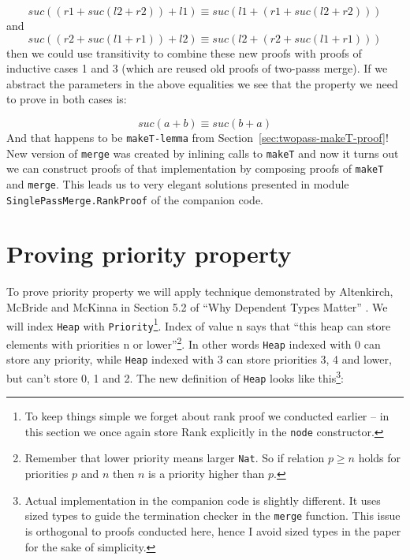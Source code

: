 \begin{equation*}
suc ((r1 + suc (l2 + r2)) + l1) ≡ suc (l1 + (r1 + suc (l2 + r2)))
\end{equation*}
\noindent
and
\begin{equation*}
suc ((r2 + suc (l1 + r1)) + l2) ≡ suc (l2 + (r2  + suc (l1 + r1)))
\end{equation*}
\noindent
then we could use transitivity to combine these new proofs with proofs of inductive cases 1 and 3 (which are reused old proofs of two-passs merge). If we abstract the parameters in the above equalities we see that the property we need to prove in both cases is:

\begin{equation*}
suc (a + b) ≡ suc (b + a)
\end{equation*}
\noindent
And that happens to be \texttt{makeT-lemma} from Section~\ref{sec:twopass-makeT-proof}! New version of \texttt{merge} was created by inlining calls to \texttt{makeT} and now it turns out we can construct proofs of that implementation by composing proofs of \texttt{makeT} and \texttt{merge}. This leads us to very elegant solutions presented in module \texttt{SinglePassMerge.}\texttt{RankProof} of the companion code.

\section[Proving priority property]{Proving priority property} \label{sec:priority-invariant}

To prove priority property we will apply technique demonstrated by Altenkirch, McBride and McKinna in Section 5.2 of ``Why Dependent Types Matter'' \cite{AltMcBMcK05}. We will index \texttt{Heap} with \texttt{Priority}\footnote{To keep things simple we forget about rank proof we conducted earlier -- in this section we once again store Rank explicitly in the \texttt{node} constructor.}. Index of value n says that ``this heap can store elements with priorities n or lower''\footnote{Remember that lower priority means larger \texttt{Nat}. So if relation $p ≥ n$ holds for priorities $p$ and $n$ then $n$ is a priority higher than $p$.}. In other words \texttt{Heap} indexed with 0 can store any priority, while \texttt{Heap} indexed with 3 can store priorities 3, 4 and lower, but can't store 0, 1 and 2. The new definition of \texttt{Heap} looks like this\footnote{Actual implementation in the companion code is slightly different. It uses sized types \cite{Abe08} to guide the termination checker in the \texttt{merge} function. This issue is orthogonal to proofs conducted here, hence I avoid sized types in the paper for the sake of simplicity.}:

